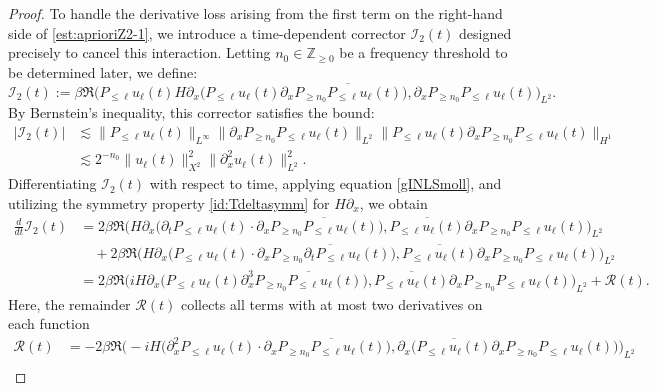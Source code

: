 \documentclass[10pt,a4paper]{amsart}
\newcommand{\Z}{\mathbb{Z}}
\begin{document}
\begin{proof}
\medskip
To handle the derivative loss arising from the first term on the right-hand side of \eqref{est:aprioriZ2-1}, we introduce a time-dependent corrector $\mathcal{I}_2(t)$ designed precisely to cancel this interaction. Letting $n_0\in \Z_{\geq 0}$ be a frequency threshold to be determined later, we define:
\begin{equation}\label{def:I2}
\mathcal{I}_2(t):=\beta\Re \big( P_{\leq \ell}u_\ell(t)H\partial_x\big(P_{\leq \ell}u_\ell(t)\partial_x\overline{P_{\geq n_0}P_{\leq \ell}u_\ell(t)}\big) ,\partial_xP_{\geq n_0}P_{\leq \ell}u_\ell(t)\big)_{L^2} .
\end{equation}
By Bernstein's inequality, this corrector satisfies the bound:
\begin{equation}\label{bd:I2}
\begin{aligned}
|\mathcal{I}_2(t)|
&\lesssim \| P_{\leq \ell}u_\ell(t) \|_{L^\infty}\| \partial_xP_{\geq n_0}P_{\leq \ell}u_\ell(t) \|_{L^2} \| P_{\leq \ell}u_\ell(t)\partial_xP_{\geq n_0}P_{\leq \ell}u_\ell(t) \|_{H^1} \\
&\lesssim 2^{-n_0}\| u_\ell(t) \|_{X^2}^2\| \partial_x^2u_\ell(t) \|_{L^2}^2.
\end{aligned}
\end{equation}
Differentiating $\mathcal{I}_2(t)$ with respect to time, applying equation \eqref{gINLSmoll}, and utilizing the symmetry property \eqref{id:Tdeltasymm} for $H\partial_x$, we obtain
$$
    \begin{aligned}
    \frac{d}{dt}\mathcal{I}_2(t)&=2\beta \Re \big( H\partial_x\big(\partial_tP_{\leq \ell}u_\ell(t)\cdot \partial_x\overline{P_{\geq n_0}P_{\leq \ell}u_\ell(t)}\big) ,\overline{P_{\leq \ell}u_\ell(t)}\partial_xP_{\geq n_0}P_{\leq \ell}u_\ell(t)\big)_{L^2} \\
    &\quad +2\beta \Re \big( H\partial_x\big(P_{\leq \ell}u_\ell(t)\cdot \partial_x\overline{P_{\geq n_0}\partial_tP_{\leq \ell}u_\ell(t)}\big) ,\overline{P_{\leq \ell}u_\ell(t)}\partial_xP_{\geq n_0}P_{\leq \ell}u_\ell(t)\big)_{L^2} \\
    &=2\beta \Re \big( iH\partial_x\big(P_{\leq \ell}u_\ell(t) \partial_x^3\overline{P_{\geq n_0}P_{\leq \ell}u_\ell(t)}\big) ,\overline{P_{\leq \ell}u_\ell(t)}\partial_xP_{\geq n_0}P_{\leq \ell}u_\ell(t)\big)_{L^2} +\mathcal{R}(t).
\end{aligned}
$$
Here, the remainder $\mathcal{R}(t)$ collects all terms with at most two derivatives on each function$$\begin{aligned}
    \mathcal{R}(t)&=-2\beta \Re\big(  {-}iH\big(\partial_x^2P_{\leq \ell}u_\ell(t)\cdot \partial_x\overline{P_{\geq n_0}P_{\leq \ell}u_\ell(t)}\big) ,\partial_x\big( \overline{P_{\leq \ell}u_\ell(t)}\partial_xP_{\geq n_0}P_{\leq \ell}u_\ell(t)\big) \big)_{L^2} \\

\end{aligned}$$
\end{proof}
\end{document}

